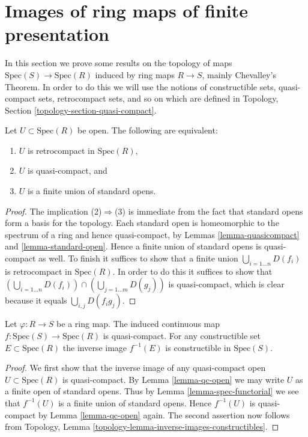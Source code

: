 \section{Images of ring maps of finite presentation}
\label{section-images-finite-presentation}

\noindent
In this section we prove some results on the 
topology of maps $\text{Spec}(S) \to \text{Spec}(R)$
induced by ring maps $R \to S$, mainly Chevalley's Theorem.
In order to do this we will use the notions of constructible sets,
quasi-compact sets, retrocompact sets, and so on
which are defined in Topology, Section \ref{topology-section-quasi-compact}.

\begin{lemma}
\label{lemma-qc-open}
Let $U \subset \text{Spec}(R)$ be open. The following
are equivalent:
\begin{enumerate}
\item $U$ is retrocompact in $\text{Spec}(R)$,
\item $U$ is quasi-compact, and
\item $U$ is a finite union of standard opens.
\end{enumerate}
\end{lemma}

\begin{proof}
The implication (2)$\Rightarrow$(3) is immediate from the fact that standard
opens form a basis for the topology. Each standard open is
homeomorphic to the spectrum of a ring and hence quasi-compact,
by Lemmas \ref{lemma-quasicompact} and \ref{lemma-standard-open}.
Hence a finite union of standard opens is quasi-compact as well.
To finish it suffices to show that a finite union
$\bigcup_{i=1\ldots n} D(f_i)$ is retrocompact in $\text{Spec}(R)$.
In order to do this it suffices to show that 
$(\bigcup_{i=1\ldots n} D(f_i)) \cap (\bigcup_{j=1\ldots m} D(g_j))$
is quasi-compact, which is clear because it equals
$\bigcup_{i,j} D(f_i g_j)$.
\end{proof}

\begin{lemma}
\label{lemma-affine-map-quasi-compact}
Let $\varphi : R \to S$ be a ring map.
The induced continuous map $f : \text{Spec}(S) \to \text{Spec}(R)$
is quasi-compact. For any constructible set $E \subset \text{Spec}(R)$
the inverse image $f^{-1}(E)$ is constructible in $\text{Spec}(S)$.
\end{lemma}

\begin{proof}
We first show that the inverse image of any quasi-compact
open $U \subset \text{Spec}(R)$ is quasi-compact. By
Lemma \ref{lemma-qc-open} we may write $U$ as a finite
open of standard opens. Thus by Lemma \ref{lemma-spec-functorial}
we see that $f^{-1}(U)$ is a finite union of standard opens.
Hence $f^{-1}(U)$ is quasi-compact by Lemma \ref{lemma-qc-open} again.
The second assertion now follows from Topology, Lemma 
\ref{topology-lemma-inverse-images-constructibles}.
\end{proof}


